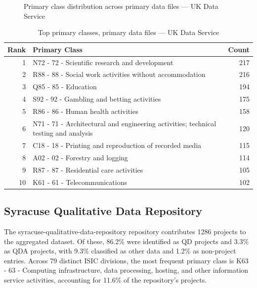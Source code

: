 \clearpage

\begin{figure}[H]
    \centering
    
    \caption{Primary class distribution across primary data files --- UK Data Service}
\end{figure}

\begin{table}[H]
    \centering
    \begin{tabular}{r p{10cm} r}
    \hline
    \textbf{Rank} & \textbf{Primary Class} & \textbf{Count} \\
    \hline
    1 & N72 - 72 - Scientific research and development & 217 \\
    2 & R88 - 88 - Social work activities without accommodation & 216 \\
    3 & Q85 - 85 - Education & 194 \\
    4 & S92 - 92 - Gambling and betting activities & 175 \\
    5 & R86 - 86 - Human health activities & 158 \\
    6 & N71 - 71 - Architectural and engineering activities; technical testing and analysis & 120 \\
    7 & C18 - 18 - Printing and reproduction of recorded media & 115 \\
    8 & A02 - 02 - Forestry and logging & 114 \\
    9 & R87 - 87 - Residential care activities & 105 \\
    10 & K61 - 61 - Telecommunications & 102 \\
    \hline
    \end{tabular}
    \caption{Top primary classes, primary data files --- UK Data Service}
\end{table}

\clearpage

\subsection{Syracuse Qualitative Data Repository}


The syracuse-qualitative-data-repository repository contributes 1286 projects to the aggregated dataset. Of these, 86.2\% were identified as QD projects and 3.3\% as QDA projects, with 9.3\% classified as other data and 1.2\% as non-project entries. Across 79 distinct ISIC divisions, the most frequent primary class is K63 - 63 - Computing infrastructure, data processing, hosting, and other information service activities, accounting for 11.6\% of the repository's projects.


